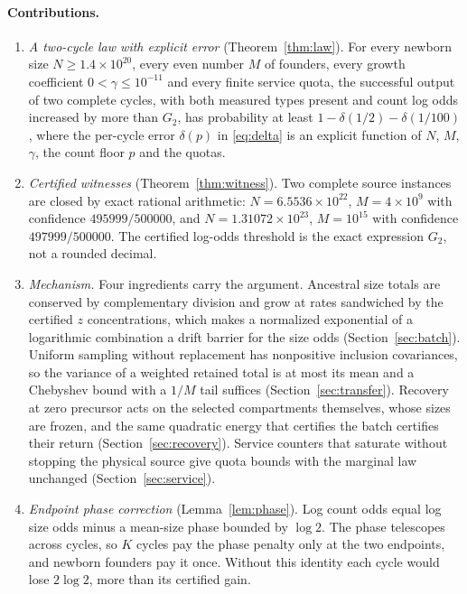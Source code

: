 \documentclass[11pt,a4paper]{article}
\theoremstyle{plain}
\theoremstyle{definition}
\theoremstyle{remark}
\begin{document}
\paragraph{Contributions.}
\begin{enumerate}[label=(\roman*)]
\item \emph{A two-cycle law with explicit error} (Theorem~\ref{thm:law}). For every newborn size $N\ge1.4\times10^{20}$, every even number $M$ of founders, every growth coefficient $0<\gamma\le10^{-11}$ and every finite service quota, the successful output of two complete cycles, with both measured types present and count log odds increased by more than $G_2$, has probability at least $1-\delta(1/2)-\delta(1/100)$, where the per-cycle error $\delta(p)$ in \eqref{eq:delta} is an explicit function of $N$, $M$, $\gamma$, the count floor $p$ and the quotas.
\item \emph{Certified witnesses} (Theorem~\ref{thm:witness}). Two complete source instances are closed by exact rational arithmetic: $N=6.5536\times10^{22}$, $M=4\times10^{9}$ with confidence $495999/500000$, and $N=1.31072\times10^{23}$, $M=10^{15}$ with confidence $497999/500000$. The certified log-odds threshold is the exact expression $G_2$, not a rounded decimal.
\item \emph{Mechanism.} Four ingredients carry the argument. Ancestral size totals are conserved by complementary division and grow at rates sandwiched by the certified $z$ concentrations, which makes a normalized exponential of a logarithmic combination a drift barrier for the size odds (Section~\ref{sec:batch}). Uniform sampling without replacement has nonpositive inclusion covariances, so the variance of a weighted retained total is at most its mean and a Chebyshev bound with a $1/M$ tail suffices (Section~\ref{sec:transfer}). Recovery at zero precursor acts on the selected compartments themselves, whose sizes are frozen, and the same quadratic energy that certifies the batch certifies their return (Section~\ref{sec:recovery}). Service counters that saturate without stopping the physical source give quota bounds with the marginal law unchanged (Section~\ref{sec:service}).
\item \emph{Endpoint phase correction} (Lemma~\ref{lem:phase}). Log count odds equal log size odds minus a mean-size phase bounded by $\log2$. The phase telescopes across cycles, so $K$ cycles pay the phase penalty only at the two endpoints, and newborn founders pay it once. Without this identity each cycle would lose $2\log2$, more than its certified gain.

\end{enumerate}
\end{document}
